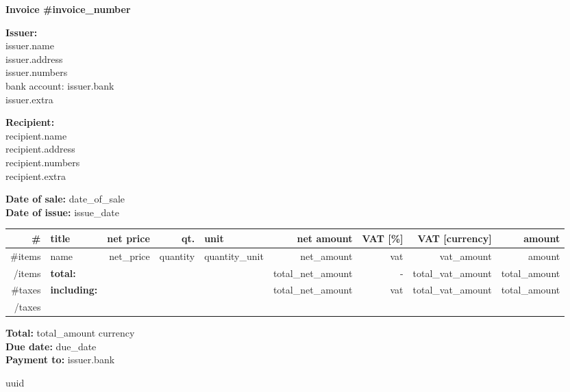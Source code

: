 \documentclass[11pt]{article}
\begin{document}
\begin{center}
  \Large
  \textbf{Invoice \#{{invoice_number}}}
\end{center}

\textbf{Issuer:} \\
       {{issuer.name}} \\
       {{issuer.address}} \\
       {{issuer.numbers}} \\
       bank account: {{issuer.bank}} \\
       {{issuer.extra}}

\textbf{Recipient:} \\
       {{recipient.name}} \\
       {{recipient.address}} \\
       {{recipient.numbers}} \\
       {{recipient.extra}}

\textbf{Date of sale:} {{date_of_sale}} \\
\textbf{Date of issue:} {{issue_date}}

\newcommand{\itemindex}{\stepcounter{ItemIndex} \theItemIndex}


\begin{center}
  \small
  \begin{tabular}{rlrrlrrrr}
    \# & title & net price & qt. & unit & net amount & VAT [\%] & VAT [{{currency}}] & amount \\
    \hline
    {{#items}}
     \itemindex & {{name}} & {{net_price}} & {{quantity}} & {{quantity_unit}} & {{net_amount}} & {{vat}} & {{vat_amount}} & {{amount}} \\
    {{/items}}

    \hline
    & \textbf{total:} &  &  &  & {{total_net_amount}} & - & {{total_vat_amount}} & {{total_amount}} \\
    \hline
    {{#taxes}}
      & \ifnum \theTaxIndex=0 \textbf{including:}\stepcounter{TaxIndex} \fi &  &  &  & {{total_net_amount}} & {{vat}} & {{total_vat_amount}} & {{total_amount}} \\
    {{/taxes}}
  \end{tabular}
\end{center}

\textbf{Total:} {{total_amount}} {{currency}} \\
\textbf{Due date:} {{due_date}} \\
\textbf{Payment to:} {{issuer.bank}}

\begin{center}
  \tiny
  {{uuid}}
\end{center}
\end{document}

